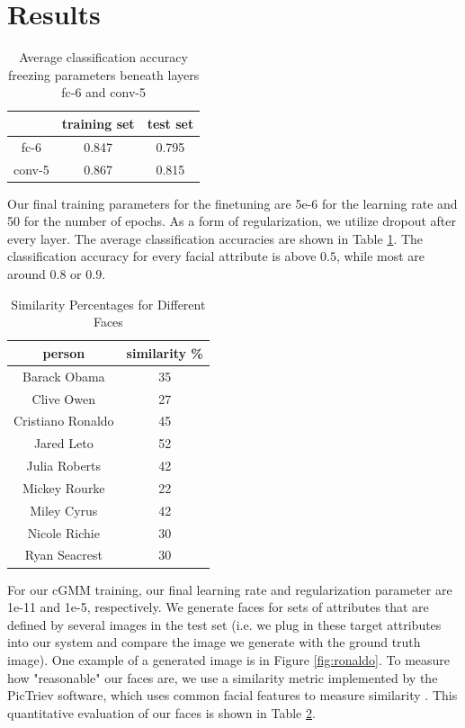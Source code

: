 \documentclass[10pt,twocolumn,letterpaper]{article}
\begin{document}
\section{Results}
\begin{table}[h]
    \centering
    \begin{tabular}{|c|c|c|}
        \hline  & training set & test set \\ \hline
        fc-6 & 0.847 & 0.795 \\
        conv-5 & 0.867  & 0.815 \\ \hline
    \end{tabular}
    \caption{Average classification accuracy freezing parameters beneath layers fc-6 and conv-5}
    \label{tab:finetuningresults}
\end{table}
Our final training parameters for the finetuning are 5e-6 for the learning rate and 50 for the number of epochs. As a form of regularization, we utilize dropout after every layer. The average classification accuracies are shown in Table \ref{tab:finetuningresults}. The classification accuracy for every facial attribute is above $0.5$, while most are around $0.8$ or $0.9$. 


\begin{table}[h]
    \centering
    \begin{tabular}{|c|c|}
        \hline person & similarity \% \\ \hline
        Barack Obama & 35 \\
        Clive Owen & 27 \\ 
        Cristiano Ronaldo & 45 \\
        Jared Leto & 52 \\
        Julia Roberts & 42 \\
        Mickey Rourke & 22 \\
        Miley Cyrus & 42 \\
        Nicole Richie & 30 \\
        Ryan Seacrest & 30 \\ \hline
    \end{tabular}
    \caption{Similarity Percentages for Different Faces}
    \label{tab:facesim}
\end{table} 

For our cGMM training, our final learning rate and regularization parameter are 1e-11 and 1e-5, respectively. We generate faces for sets of attributes that are defined by several images in the test set (i.e. we plug in these target attributes into our system and compare the image we generate with the ground truth image). One example of a generated image is in Figure \ref{fig:ronaldo}. To measure how "reasonable" our faces are, we use a similarity metric implemented by the PicTriev software, which uses common facial features to measure similarity \cite{pict}. This quantitative evaluation of our faces is shown in Table \ref{tab:facesim}.
\end{document}
